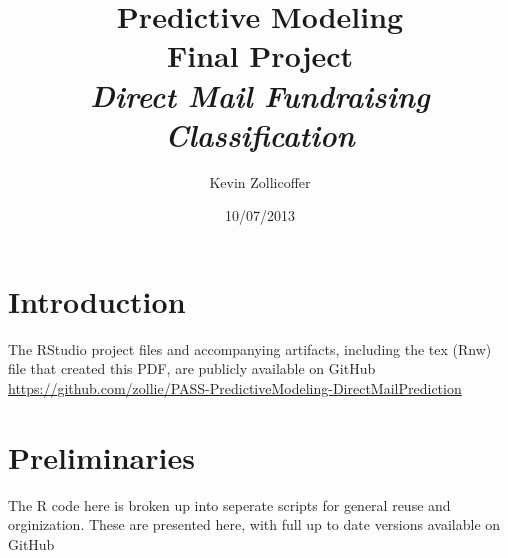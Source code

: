 \documentclass{article}
\author{Kevin Zollicoffer}
\title{Predictive Modeling\\Final Project\\\emph{Direct Mail Fundraising Classification}}
\date{10/07/2013}
\begin{document}
\maketitle


\section*{Introduction}
The RStudio project files and accompanying artifacts, including the tex (Rnw) file that created this PDF, are publicly available on GitHub
\\
\url{https://github.com/zollie/PASS-PredictiveModeling-DirectMailPrediction}

\section*{Preliminaries}
The R code here is broken up into seperate scripts for general reuse and orginization. These are presented here, with full up to date versions available on GitHub
\end{document}
